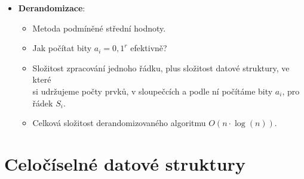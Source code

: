 \documentclass[11pt,a4paper]{article}
\begin{document}
\begin{itemize}
\begin{itemize}
\begin{itemize}
            \item Omezíme křížové součiny $|S_i|\cdot|S_{<i}|$.
            \item Využijeme odhadu $d^2 \leq 4 \cdot \binom{d}{2}$, což platí pouze pro nějaká $d$, k provázání $|S_j|^2$ s $q$, kdy $q$ je celkový počet kolizí původních.
            \item Dosadíme do velké původní sumy pro $\#$\textit{kolizí} a dostaneme odhad $\#$\textit{kolizí} $\leq n \cdot \left\lfloor 2^{3-r} \cdot q \right\rfloor $. 
        \end{itemize}
    \end{itemize}
    \item \textbf{Derandomizace}:
    \begin{itemize}
        \item Metoda podmíněné střední hodnoty.
        \item Jak počítat bity $a_i = {0,1}^r$ efektivně?
        \item Složitost zpracování jednoho řádku, plus složitost datové struktury, ve které \\ si udržujeme počty prvků, v sloupečcích a podle ní počítáme bity $a_i$, pro řádek $S_i$.
        \item Celková složitost derandomizovaného algoritmu $O(n \cdot \log(n))$.
    \end{itemize}
\end{itemize}
\section{Celočíselné datové struktury}
\end{document}
